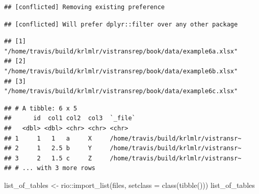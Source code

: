 \documentclass[]{book}
\newenvironment{Shaded}{}{}
\newcommand{\DataTypeTok}[1]{#1}
\newcommand{\KeywordTok}[1]{\textcolor[rgb]{0.00,0.00,1.00}{#1}}
\newcommand{\NormalTok}[1]{#1}
\newcommand{\OperatorTok}[1]{#1}
\newcommand{\OtherTok}[1]{\textcolor[rgb]{1.00,0.25,0.00}{#1}}
\newcommand{\StringTok}[1]{\textcolor[rgb]{0.00,0.50,0.50}{#1}}
\begin{document}
\begin{verbatim}
## [conflicted] Removing existing preference
\end{verbatim}

\begin{verbatim}
## [conflicted] Will prefer dplyr::filter over any other package
\end{verbatim}

\begin{Shaded}
\end{Shaded}

\begin{verbatim}
## [1] "/home/travis/build/krlmlr/vistransrep/book/data/example6a.xlsx"
## [2] "/home/travis/build/krlmlr/vistransrep/book/data/example6b.xlsx"
## [3] "/home/travis/build/krlmlr/vistransrep/book/data/example6c.xlsx"
\end{verbatim}

\begin{Shaded}
\end{Shaded}

\begin{verbatim}
## # A tibble: 6 x 5
##      id  col1 col2  col3  `_file`                             
##   <dbl> <dbl> <chr> <chr> <chr>                               
## 1     1   1   a     X     /home/travis/build/krlmlr/vistransr~
## 2     1   2.5 b     Y     /home/travis/build/krlmlr/vistransr~
## 3     2   1.5 c     Z     /home/travis/build/krlmlr/vistransr~
## # ... with 3 more rows
\end{verbatim}

\begin{Shaded}
\begin{Highlighting}[]
\NormalTok{list_of_tables <-}\StringTok{ }\NormalTok{rio}\OperatorTok{::}\KeywordTok{import_list}\NormalTok{(files, }\DataTypeTok{setclass =} \KeywordTok{class}\NormalTok{(}\KeywordTok{tibble}\NormalTok{()))}
\NormalTok{list_of_tables}
\end{Highlighting}
\end{Shaded}
\end{document}
